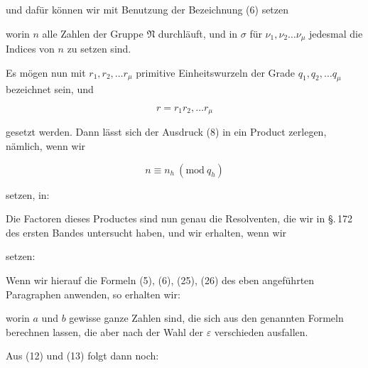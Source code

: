 und dafür können wir mit Benutzung der Bezeichnung (6) setzen


worin $n$ alle Zahlen der Gruppe $\mathfrak{N}$ durchläuft, und in $\sigma$ für
$\nu_1, \nu_2 \ldots \nu_\mu$ jedesmal die Indices von $n$ zu setzen sind.

Es mögen nun mit $r_1, r_2, \ldots r_\mu$ primitive Einheitswurzeln der Grade
$q_1, q_2, \ldots q_\mu$ bezeichnet sein, und

\[ r = r_1 r_2, \ldots r_\mu \]

gesetzt werden. Dann lässt sich der Ausdruck (8) in ein Product zerlegen,
nämlich, wenn wir

\[ n \equiv n_h \ (\mathrm{mod}\ q_h) \]

setzen, in:


Die Factoren dieses Productes sind nun genau die Resolventen, die wir in
\S.\,172 des ersten Bandes untersucht haben, und wir erhalten, wenn wir


setzen:


Wenn wir hierauf die Formeln (5), (6), (25), (26) des eben angeführten
Paragraphen anwenden, so erhalten wir:



worin $a$ und $b$ gewisse ganze Zahlen sind, die sich aus den genannten
Formeln berechnen lassen, die aber nach der Wahl der $\varepsilon$
verschieden ausfallen.

Aus (12) und (13) folgt dann noch:

